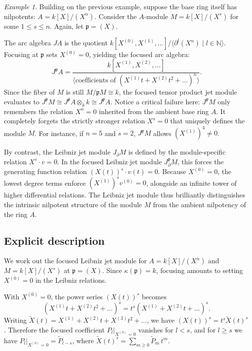 \documentclass[a4paper, 12pt]{amsart}
\theoremstyle{definition}
\theoremstyle{remark}
\newtheorem{example}[theorem]{Example}
\begin{document}
\begin{example}
  Building on the previous example, suppose the base ring itself has nilpotents: $A = k[X]/(X^n)$. Consider the $A$-module $M = k[X]/(X^s)$ for some $1 \le s \le n$. Again, let $\mathfrak{p} = (X)$.
  
  The arc algebra $JA$ is the quotient $k[X^{(0)}, X^{(1)}, \dots] / \langle \partial^l(X^n) \mid l \in \mathbb{N} \rangle$. Focusing at $\mathfrak{p}$ sets $X^{(0)} = 0$, yielding the focused arc algebra:
  \begin{equation*}
    J^\mathfrak{p}A = \frac{k[X^{(1)}, X^{(2)}, \dots]}{\langle \text{coefficients of } (X^{(1)}t + X^{(2)}t^2 + \dots)^n \rangle}.
  \end{equation*}
  Since the fiber of $M$ is still $M/\mathfrak{p}M \cong k$, the focused tensor product jet module evaluates to $J^\mathfrak{p}M \cong J^\mathfrak{p}A \otimes_k k \cong J^\mathfrak{p}A$. 
  Notice a critical failure here: $J^\mathfrak{p}M$ only remembers the relation $X^n = 0$ inherited from the ambient base ring $A$. It completely forgets the strictly stronger relation $X^s = 0$ that uniquely defines the module $M$. For instance, if $n=5$ and $s=2$, $J^\mathfrak{p}M$ allows $(X^{(1)})^4 \neq 0$.
  
  By contrast, the Leibniz jet module $J_\partial M$ is defined by the module-specific relation $X^s \cdot v = 0$. In the focused Leibniz jet module $J^\mathfrak{p}_\partial M$, this forces the generating function relation $(X(t))^s \cdot v(t) = 0$. Because $X^{(0)} = 0$, the lowest degree terms enforce $(X^{(1)})^s v^{(0)} = 0$, alongside an infinite tower of higher differential relations. The Leibniz jet module thus brilliantly distinguishes the intrinsic nilpotent structure of the module $M$ from the ambient nilpotency of the ring $A$.
\end{example}

\subsection{Explicit description}
\label{sec:expl-focused}

We work out the focused Leibniz jet module
for $A = k[X]/(X^n)$ and $M = k[X]/(X^s)$ at $\mathfrak{p} = (X)$.
Since $\kappa(\mathfrak{p}) = k$,
focusing amounts to setting $X^{(0)} = 0$ in the Leibniz relations.

With $X^{(0)} = 0$, the power series $(X(t))^s$ becomes
\begin{equation*}
  (X^{(1)}t + X^{(2)}t^2 + \dots)^s = t^s(X^{(1)} + X^{(2)}t + \dots)^s.
\end{equation*}
Writing $\widetilde{X}(t) = X^{(1)} + X^{(2)}t + X^{(3)}t^2 + \dots$,
we have $(X(t))^s = t^s \widetilde{X}(t)^s$.
Therefore the focused coefficient $P_l|_{X^{(0)}=0}$ vanishes for $l < s$,
and for $l \ge s$ we have $P_l|_{X^{(0)}=0} = \widetilde{P}_{l - s}$,
where $\widetilde{X}(t)^s = \sum_{m \ge 0} \widetilde{P}_m\, t^m$.
\end{document}
